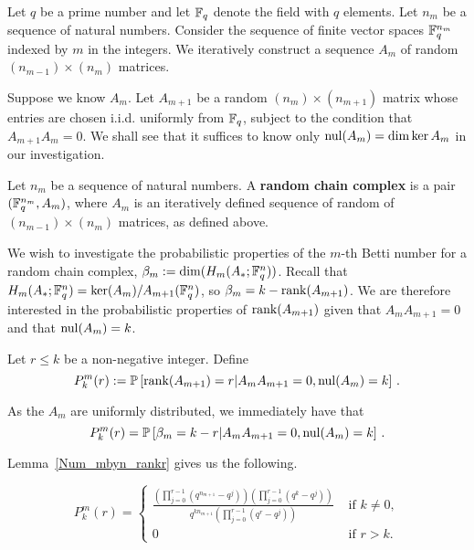 Let $q$ be a prime number and let $\mathbb{F}_q$ denote the field with $q$ elements. Let $n_m$ be a sequence of natural numbers. Consider the sequence of finite vector spaces $\mathbb{F}_q^{n_m}$ indexed by $m$ in the integers.  We iteratively construct a sequence $A_m$ of random $(n_{m-1})\times (n_m)$ matrices.

Suppose we know $A_{m}$. Let $A_{m+1}$ be a random $(n_{m})\times (n_{m+1})$ matrix whose entries are chosen i.i.d. uniformly from $\mathbb{F}_q$, subject to the condition that $A_{m+1}A_{m} = 0$. We shall see that it suffices to know only $\mathrm{nul}(A_m) = \dim\ker A_{m}$ in our investigation.

\begin{definition}
Let $n_m$ be a sequence of natural numbers. A \textbf{random chain complex} is a pair $(\mathbb{F}_q^{n_m},A_m)$, where $A_m$ is an iteratively defined sequence of random of $(n_{m-1})\times (n_m)$ matrices, as defined above.  
\end{definition}



We wish to investigate the probabilistic properties of the $m$-th Betti number for a random chain complex, $\beta_m := \dim(H_m(A_\ast; \mathbb{F}_q^{n}))$.  Recall that $H_m(A_\ast;\mathbb{F}_q^{n}) = \ker (A_{m})/ A_{m+1}(\mathbb{F}_q^{n})$, so $\beta_m = k - \operatorname{\mathrm{rank}}(A_{m+1})$.  We are therefore interested in the probabilistic properties of $\operatorname{\mathrm{rank}}(A_{m+1})$ given that $A_{m}A_{m+1} = 0$ and that $\mathrm{nul}(A_{m}) = k$. 


\begin{definition}

Let $r \leq k$ be a non-negative integer.  Define 
\[
  P^m_k(r) := \mathbb{P} 
  \left[\operatorname{\mathrm{rank}}(A_{m+1}) = r|A_{m}A_{m+1} = 0, \mathrm{nul}(A_{m}) = k \right] \, .
\]
\end{definition}

As the $A_m$ are uniformly distributed, we immediately have that
\[
P^m_k(r) = \mathbb{P}\left[\beta_m = k-r | A_{m}A_{m+1} = 0, \mathrm{nul}(A_{m}) = k\right] \, .
\]


Lemma~\ref{Num_mbyn_rankr} gives us the following.
\begin{lemma}
\[
P^m_k(r) = \begin{cases}
  {\displaystyle \frac{\left(\prod_{j=0}^{r-1}\left(q^{n_{m+1}}-q^{j}\right)\right)
  \left(\prod_{j=0}^{r-1}\left(q^k - q^j \right) \right)}
  {q^{kn_{m+1}} \left(\prod_{j=0}^{r-1} \left(q^r-q^j\right)\right)}}
            					& \textrm{ if } k\neq 0,\\
           0					&  \textrm{ if }  r>k. 
            \end{cases}
\]
\end{lemma}


